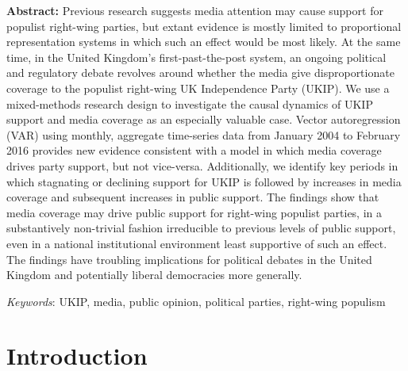 \documentclass[12pt,]{article}
\renewenvironment{abstract}
 {{%
    \setlength{\leftmargin}{0mm}
    \setlength{\rightmargin}{\leftmargin}%
    \footnotesize
  }%
  \relax}
 {\endlist}
\begin{document}
\begin{abstract}

    \hbox{\vrule height .2pt width 39.14pc}

    \vskip 8.5pt %

\noindent \footnotesize \textbf{Abstract:} Previous research suggests media attention may cause support for
populist right-wing parties, but extant evidence is mostly limited to
proportional representation systems in which such an effect would be
most likely. At the same time, in the United Kingdom's
first-past-the-post system, an ongoing political and regulatory debate
revolves around whether the media give disproportionate coverage to the
populist right-wing UK Independence Party (UKIP). We use a mixed-methods
research design to investigate the causal dynamics of UKIP support and
media coverage as an especially valuable case. Vector autoregression
(VAR) using monthly, aggregate time-series data from January 2004 to
February 2016 provides new evidence consistent with a model in which
media coverage drives party support, but not vice-versa. Additionally,
we identify key periods in which stagnating or declining support for
UKIP is followed by increases in media coverage and subsequent increases
in public support. The findings show that media coverage may drive
public support for right-wing populist parties, in a substantively
non-trivial fashion irreducible to previous levels of public support,
even in a national institutional environment least supportive of such an
effect. The findings have troubling implications for political debates
in the United Kingdom and potentially liberal democracies more
generally.


\vskip 8.5pt \noindent \footnotesize \emph{Keywords}: UKIP, media, public opinion, political parties, right-wing populism \par

    \hbox{\vrule height .2pt width 40pc}



\end{abstract}


\vskip 6.5pt

\noindent  \section{Introduction}\label{introduction}
\end{document}
